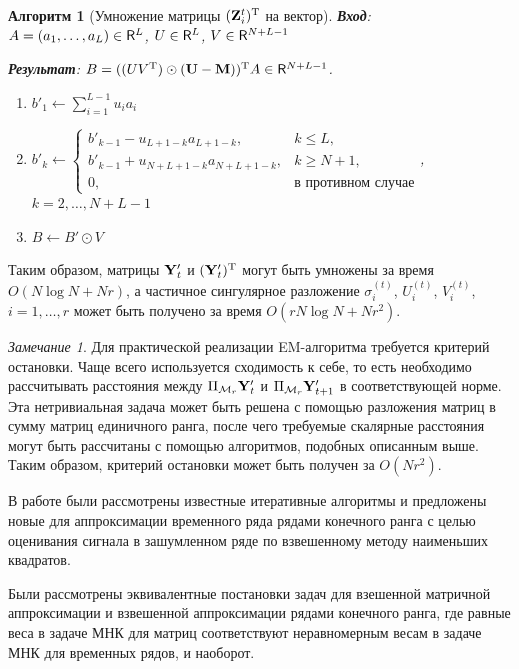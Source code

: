 \documentclass[12pt, specialist, subf,href,colorlinks=true,substylefile = spbu.rtx]{disser}
\newtheorem{algorithm}{Алгоритм}
\theoremstyle{remark}
\newtheorem{remark}{Замечание}
\theoremstyle{definition}
\begin{document}
\begin{algorithm}[Умножение матрицы $(\mathbf{Z}^{t}_i)^{\mathrm{T}}$ на вектор]
	\textbf{Вход}: $A = (a_1, \ldots, a_L) \in \mathsf{R}^L$, $U \in \mathsf{R}^L$, $V \in \mathsf{R}^{N + L - 1}$
	
	\textbf{Результат}:
	$B = ((U V^{\mathrm{T}}) \odot (\mathbf{U}-\mathbf{M}))^{\mathrm{T}} A \in \mathsf{R}^{N + L - 1}$.
	
	\begin{enumerate}
		\item
		$b'_1 \leftarrow \sum\limits_{i=1}^{L - 1}u_i a_i$
		\item
		$b'_k \leftarrow \begin{cases}
		b'_{k - 1} - u_{L + 1 - k} a_{L + 1 - k}, & k \le L, \\
		b'_{k - 1} + u_{N + L + 1 - k} a_{N + L + 1 - k}, & k \ge N + 1,\\
		0, & \text{в противном случае}
		\end{cases}$, $k = 2, \ldots, N + L - 1$
		\item
		$B \leftarrow B' \odot V$
	\end{enumerate}
\end{algorithm}
Таким образом, матрицы $\mathbf{Y}'_t$ и $(\mathbf{Y}'_t)^{\mathrm{T}}$ могут быть умножены за время $O(N \log N + Nr)$, а частичное сингулярное разложение $\sigma_i^{(t)}$, $U_i^{(t)}$, $V_i^{(t)}$, $i = 1, \ldots, r$ может быть получено за время $O(r N \log N + N r^2)$. 
\begin{remark}
	Для практической реализации EM-алгоритма требуется критерий остановки. Чаще всего используется сходимость к себе, то есть необходимо рассчитывать расстояния между $\Pi_{\mathcal{M}_r} \mathbf{Y}'_t$ и $\Pi_{\mathcal{M}_r} \mathbf{Y}'_{t + 1}$ в соответствующей норме. Эта нетривиальная задача может быть решена с помощью разложения матриц в сумму матриц единичного ранга, после чего требуемые скалярные расстояния могут быть рассчитаны с помощью алгоритмов, подобных описанным выше. Таким образом, критерий остановки может быть получен за $O(N r^2)$.
\end{remark}

\conclusion
\label{sec:concl}
В работе были рассмотрены известные итеративные алгоритмы и предложены новые для аппроксимации временного ряда рядами конечного ранга с целью
оценивания сигнала в зашумленном ряде по взвешенному методу наименьших квадратов.

Были рассмотрены эквивалентные постановки задач для взешенной матричной аппроксимации и взвешенной аппроксимации рядами конечного ранга, где равные веса в задаче МНК для матриц соответствуют неравномерным весам в задаче МНК для временных рядов, и наоборот.
\end{document}
